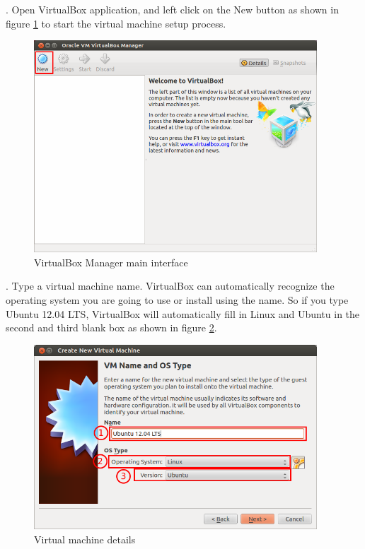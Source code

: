 \par {}. Open VirtualBox application, and left click on the New button as shown in figure \ref{fig:virtualbox-main} to start the virtual machine setup process. \\

\begin{figure}[!h]	
	\centering
	\includegraphics[width=300pt]{./images/installation/virtualbox/virtualbox-main.png}
	\caption{VirtualBox Manager main interface}	
	\label{fig:virtualbox-main}	
\end{figure}

\par {}. Type a virtual machine name. VirtualBox can automatically recognize the operating system you are going to use or install using the name. So if you type Ubuntu 12.04 LTS, VirtualBox will automatically fill in Linux and Ubuntu in the second and third blank box as shown in figure \ref{fig:wizard-newvirtual}. \\

\begin{figure}[!h]	
	\centering
	\includegraphics[width=300pt]{./images/installation/virtualbox/wizard-newvirtual.png}
	\caption{Virtual machine details}	
	\label{fig:wizard-newvirtual}	
\end{figure}

